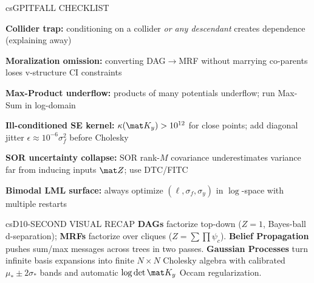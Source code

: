 \documentclass[../../../../master.tex]{subfiles}
\begin{document}
\begin{cscolumns}
\begin{cscard}{csG}{PITFALL CHECKLIST}
  \begin{csbul}
    \item \textbf{Collider trap:} conditioning on a collider \emph{or any descendant} creates dependence (explaining away)
    \item \textbf{Moralization omission:} converting DAG$\to$MRF without marrying co-parents loses v-structure CI constraints
    \item \textbf{Max-Product underflow:} products of many potentials underflow; run Max-Sum in log-domain
    \item \textbf{Ill-conditioned SE kernel:} $\kappa(\mat K_y)>10^{12}$ for close points; add diagonal jitter $\epsilon\approx 10^{-6}\sigma_f^2$ before Cholesky
    \item \textbf{SOR uncertainty collapse:} SOR rank-$M$ covariance underestimates variance far from inducing inputs $\mat Z$; use DTC/FITC
    \item \textbf{Bimodal LML surface:} always optimize $(\ell,\sigma_f,\sigma_y)$ in $\log$-space with multiple restarts
  \end{csbul}
\end{cscard}

\begin{cscard}{csD}{10-SECOND VISUAL RECAP}
  \sffamily\footnotesize
  \textbf{DAGs} factorize top-down ($Z=1$, Bayes-ball d-separation); \textbf{MRFs} factorize over cliques ($Z=\sum\prod\psi_c$).
  \textbf{Belief Propagation} pushes sum/max messages across trees in two passes.
  \textbf{Gaussian Processes} turn infinite basis expansions into finite $N\times N$ Cholesky algebra with calibrated $\mu_*\pm 2\sigma_*$ bands and automatic $\log\det\mat K_y$ Occam regularization.
\end{cscard}
\end{cscolumns}

\csend
\end{document}

